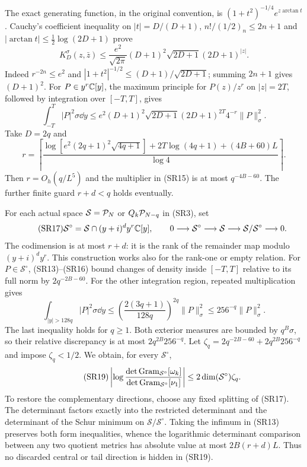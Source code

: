 The exact generating function, in the original convention, is
$(1+t^2)^{-1/4}e^{z\arctan t}$ \cite{a02sr:DLMF}. Cauchy's coefficient inequality
on $|t|=D/(D+1)$, $n!/(1/2)_n\le2n+1$ and
$|\arctan t|\le\frac12\log(2D+1)$ prove
\begin{equation}\tag{SR14}
 K_D^\sigma(z,\bar z)
 \le\frac{e^2}{\sqrt{2\pi}}(D+1)^2\sqrt{2D+1}(2D+1)^{|z|}.
\end{equation}
Indeed $r^{-2n}\le e^2$ and
$|1+t^2|^{-1/2}\le(D+1)/\sqrt{2D+1}$; summing $2n+1$ gives
$(D+1)^2$. For $P\in y^r\mathbb C[y]$, the maximum principle for $P(z)/z^r$
on $|z|=2T$, followed by integration over $[-T,T]$, gives
\begin{equation}\tag{SR15}
 \int_{-T}^T|P|^2\sigma\dd y
 \le e^2(D+1)^2\sqrt{2D+1}(2D+1)^{2T}4^{-r}\|P\|_\sigma^2.
\end{equation}
Take $D=2q$ and
\begin{equation}\tag{SR16}
 r=\left\lceil\frac{
 \log[e^2(2q+1)^2\sqrt{4q+1}]+2T\log(4q+1)+(4B+60)L}
 {\log4}\right\rceil.
\end{equation}
Then $r=O_h(q/L^5)$ and the multiplier in (SR15) is at most $q^{-4B-60}$.
The further finite guard $r+d<q$ holds eventually.

For each actual space $\mathcal S=\mathcal P_N$ or $Q_k\mathcal P_{N-q}$ in (SR3), set
\begin{equation}\tag{SR17}
 \mathcal S^\circ=\mathcal S\cap(y+i)^d y^r\mathbb C[y],\qquad
 0\longrightarrow\mathcal S^\circ\longrightarrow\mathcal S
 \longrightarrow\mathcal S/\mathcal S^\circ\longrightarrow0.
\end{equation}
The codimension is at most $r+d$: it is the rank of the remainder map modulo
$(y+i)^dy^r$. This construction works also for the rank-one or empty relation.
For $P\in\mathcal S^\circ$, (SR13)--(SR16) bound changes of density inside
$[-T,T]$ relative to its full norm by $2q^{-2B-60}$.
For the other integration region, repeated multiplication gives
\begin{equation}\tag{SR18}
 \int_{|y|>128q}|P|^2\sigma\dd y
 \le\left(\frac{2(3q+1)}{128q}\right)^{2q}\|P\|_\sigma^2
 \le256^{-q}\|P\|_\sigma^2.
\end{equation}
The last inequality holds for $q\ge1$. Both exterior measures are bounded
by $q^B\sigma$, so their relative discrepancy is at most $2q^{2B}256^{-q}$.
Let $\zeta_q=2q^{-2B-60}+2q^{2B}256^{-q}$ and impose $\zeta_q<1/2$.
We obtain, for every $\mathcal S^\circ$,
\begin{equation}\tag{SR19}
 \left|\log\frac{\det\operatorname{Gram}_{\mathcal S^\circ}[\omega_k]}
 {\det\operatorname{Gram}_{\mathcal S^\circ}[\nu_1]}\right|
 \le2\dim(\mathcal S^\circ)\zeta_q.
\end{equation}
To restore the complementary directions, choose any fixed splitting of
(SR17). The determinant factors exactly into the restricted determinant and
the determinant of the Schur minimum on $\mathcal S/\mathcal S^\circ$.
Taking the infimum in (SR13) preserves both form inequalities, whence the
logarithmic determinant comparison between any two quotient metrics has
absolute value at most $2B(r+d)L$. Thus no discarded central or tail direction
is hidden in (SR19).

